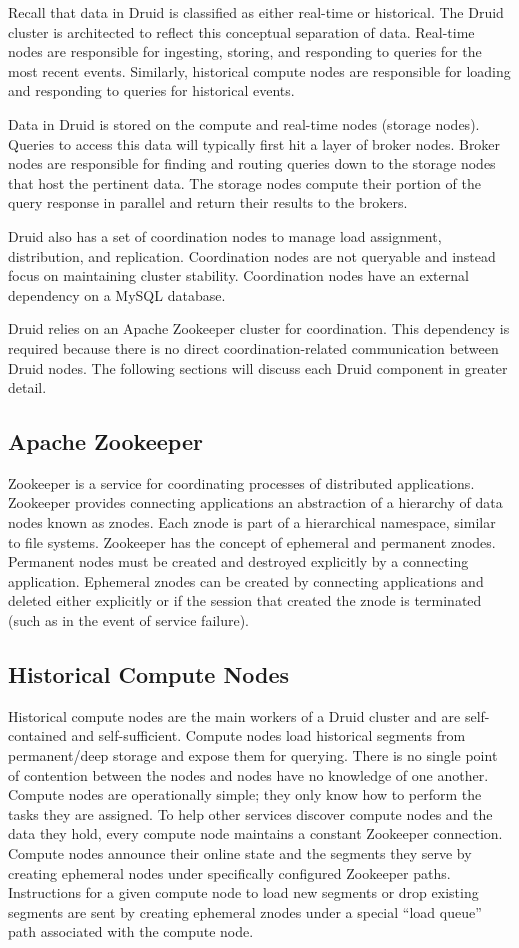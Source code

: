 \documentclass{vldb}
\begin{document}
Recall that data in Druid is classified as either real-time or
historical. The Druid cluster is architected to reflect this
conceptual separation of data. Real-time nodes are responsible for
ingesting, storing, and responding to queries for the most recent
events. Similarly, historical compute nodes are responsible for
loading and responding to queries for historical events.

Data in Druid is stored on the compute and real-time nodes (storage
nodes). Queries to access this data will typically first hit a layer
of broker nodes. Broker nodes are responsible for finding and routing
queries down to the storage nodes that host the pertinent data. The
storage nodes compute their portion of the query response in parallel
and return their results to the brokers.

Druid also has a set of coordination nodes to manage load assignment,
distribution, and replication. Coordination nodes are not queryable
and instead focus on maintaining cluster stability. Coordination nodes
have an external dependency on a MySQL database.

Druid relies on an Apache Zookeeper \cite{hunt2010zookeeper} cluster for
coordination. This dependency is required because there is no direct coordination-related communication between Druid nodes. The following sections will discuss each Druid component
in greater detail.

\subsection{Apache Zookeeper}
Zookeeper is a service for coordinating processes of distributed
applications. Zookeeper provides connecting applications an
abstraction of a hierarchy of data nodes known as znodes. Each znode
is part of a hierarchical namespace, similar to file
systems. Zookeeper has the concept of ephemeral and permanent
znodes. Permanent nodes must be created and destroyed explicitly by a
connecting application. Ephemeral znodes can be created by connecting
applications and deleted either explicitly or if the session that
created the znode is terminated (such as in the event of service
failure).

\subsection{Historical Compute Nodes}
Historical compute nodes are the main workers of a Druid cluster and
are self-contained and self-sufficient. Compute nodes load historical
segments from permanent/deep storage and expose them for
querying. There is no single point of contention between the nodes and
nodes have no knowledge of one another. Compute nodes are
operationally simple; they only know how to perform the tasks they are
assigned. To help other services discover compute nodes and the data
they hold, every compute node maintains a constant Zookeeper
connection. Compute nodes announce their online state and the segments
they serve by creating ephemeral nodes under specifically configured
Zookeeper paths. Instructions for a given compute node to load new
segments or drop existing segments are sent by creating ephemeral
znodes under a special “load queue” path associated with the compute
node.
\end{document}

